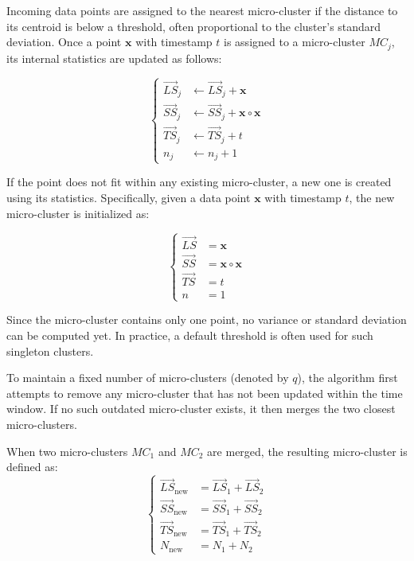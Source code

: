 Incoming data points are assigned to the nearest micro-cluster if the distance
to its centroid is below a threshold, often proportional to the cluster's
standard deviation. Once a point $\mathbf{x}$ with timestamp $t$ is assigned to
a micro-cluster $MC_j$, its internal statistics are updated as follows:

\begin{equation}
    \label{eq:clustream_insert}
    \begin{cases}
        \vec{LS}_j & \leftarrow \vec{LS}_j + \mathbf{x}                  \\
        \vec{SS}_j & \leftarrow \vec{SS}_j + \mathbf{x} \circ \mathbf{x} \\
        \vec{TS}_j & \leftarrow \vec{TS}_j + t                           \\
        n_j        & \leftarrow n_j + 1
    \end{cases}
\end{equation}

If the point does not fit within any existing micro-cluster, a new one is
created using its statistics. Specifically, given a data point $ \mathbf{x} $
with timestamp $ t $, the new micro-cluster is initialized as:

\begin{equation}
    \label{eq:clustream_create}
    \begin{cases}
        \vec{LS} & = \mathbf{x}                  \\
        \vec{SS} & = \mathbf{x} \circ \mathbf{x} \\
        \vec{TS} & = t                           \\
        n        & = 1
    \end{cases}
\end{equation}

Since the micro-cluster contains only one point, no variance or standard
deviation can be computed yet. In practice, a default threshold is often used
for such singleton clusters.

To maintain a fixed number of micro-clusters (denoted by $q$), the algorithm
first attempts to remove any micro-cluster that has not been updated within the
time window. If no such outdated micro-cluster exists, it then merges the two
closest micro-clusters.

When two micro-clusters $MC_1$ and $MC_2$ are merged, the resulting
micro-cluster is defined as:
\begin{equation}
    \label{eq:clustream_merge}
    \begin{cases}
        \vec{LS}_{\text{new}} & = \vec{LS}_1 + \vec{LS}_2 \\
        \vec{SS}_{\text{new}} & = \vec{SS}_1 + \vec{SS}_2 \\
        \vec{TS}_{\text{new}} & = \vec{TS}_1 + \vec{TS}_2 \\
        N_{\text{new}}        & = N_1 + N_2
    \end{cases}
\end{equation}

